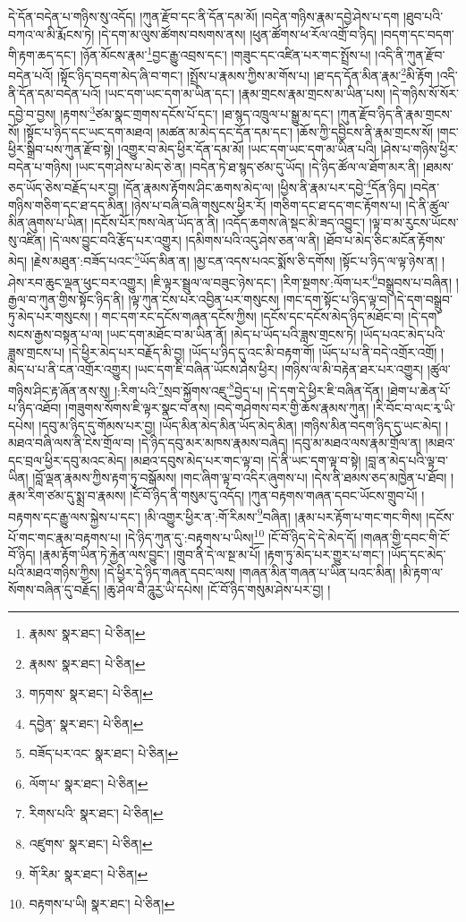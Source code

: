 དེ་དོན་བདེན་པ་གཉིས་སུ་འདོད། །ཀུན་རྫོབ་དང་ནི་དོན་དམ་མོ། །བདེན་གཉིས་རྣམ་དབྱེ་ཤེས་པ་དག །ཐུབ་པའི་བཀའ་ལ་མི་རྨོངས་ཏེ། །དེ་དག་མ་ལུས་ཚོགས་བསགས་ནས། །ཕུན་ཚོགས་ཕ་རོལ་འགྲོ་བ་ཉིད། །བདག་དང་བདག་གི་རྟག་ཆད་དང་། །ཉོན་མོངས་རྣམ་\footnote{རྣམས་  སྣར་ཐང་།  པེ་ཅིན། }བྱང་རྒྱུ་འབྲས་དང་། །གཟུང་དང་འཛིན་པར་གང་སྤྲོས་པ། །འདི་ནི་ཀུན་རྫོབ་བདེན་པའོ། །སྟོང་ཉིད་བདག་མེད་ཞི་བ་གང་། །སྤྲོས་པ་རྣམས་ཀྱིས་མ་གོས་པ། །ཐ་དད་དོན་མིན་རྣམ་\footnote{རྣམས་  སྣར་ཐང་།  པེ་ཅིན། }མི་རྟོག །འདི་ནི་དོན་དམ་བདེན་པའོ། །ཡང་དག་ཡང་དག་མ་ཡིན་དང་། །རྣམ་གྲངས་རྣམ་གྲངས་མ་ཡིན་པས། །དེ་གཉིས་སོ་སོར་དབྱེ་བ་བྱས། །རྟགས་\footnote{གཏགས་  སྣར་ཐང་།  པེ་ཅིན། }ཙམ་སྣང་གྲགས་དངོས་པོ་དང་། །ཐ་སྙད་འཁྲུལ་པ་སྒྱུ་མ་དང་། །ཀུན་རྫོབ་ཉིད་ནི་རྣམ་གྲངས་སོ། །སྟོང་པ་ཉིད་དང་ཡང་དག་མཐའ། །མཚན་མ་མེད་དང་དོན་དམ་དང་། །ཆོས་ཀྱི་དབྱིངས་ནི་རྣམ་གྲངས་སོ། །གང་ཕྱིར་སྒྲིབ་པས་ཀུན་རྫོབ་སྟེ། །འགྱུར་བ་མེད་ཕྱིར་དོན་དམ་མོ། །ཡང་དག་ཡང་དག་མ་ཡིན་པའི། །ཤེས་པ་གཉིས་ཕྱིར་བདེན་པ་གཉིས། །ཡང་དག་ཤེས་པ་མེད་ཅེ་ན། །བདེན་ཏེ་ཐ་སྙད་ཙམ་དུ་ཡོད། །དེ་ཉིད་ཚོལ་ལ་ཐོག་མར་ནི། །ཐམས་ཅད་ཡོད་ཅེས་བརྗོད་པར་བྱ། །དོན་རྣམས་རྟོགས་ཤིང་ཆགས་མེད་ལ། །ཕྱིས་ནི་རྣམ་པར་དབྱེ་\footnote{དབྱེན་  སྣར་ཐང་།  པེ་ཅིན། }དོན་ཉིད། །བདེན་གཉིས་གཅིག་དང་ཐ་དད་མིན། །ཉེས་པ་བཞི་བཞི་གསུངས་ཕྱིར་རོ། །གཅིག་དང་ཐ་དད་གང་རྟོགས་པ། །དེ་ནི་ཚུལ་མིན་ཞུགས་པ་ཡིན། །དངོས་པོར་ཁས་ལེན་ཡོད་ན་ནི། །འདོད་ཆགས་ཞེ་སྡང་མི་ཟད་འབྱུང་། །ལྟ་བ་མ་རུངས་ཡོངས་སུ་འཛིན། །དེ་ལས་བྱུང་བའི་རྩོད་པར་འགྱུར། །དམིགས་པའི་འདུ་ཤེས་ཅན་ལ་ནི། །ཐོབ་པ་མེད་ཅིང་མངོན་རྟོགས་མེད། །རྗེས་མཐུན་:བཟོད་པའང་\footnote{བཟོད་པར་འང་  སྣར་ཐང་།  པེ་ཅིན། }ཡོད་མིན་ན། །མྱ་ངན་འདས་པའང་སྨོས་ཅི་དགོས། །སྟོང་པ་ཉིད་ལ་ལྟ་ཉེས་ན། །ཤེས་རབ་ཆུང་ལྡན་ཕུང་བར་འགྱུར། །ཇི་ལྟར་སྦྲུལ་ལ་བཟུང་ཉེས་དང་། །རིག་སྔགས་:ལོག་པར་\footnote{ལོག་པ་  སྣར་ཐང་།  པེ་ཅིན། }བསྒྲུབས་པ་བཞིན། །རྒྱལ་བ་ཀུན་གྱིས་སྟོང་ཉིད་ནི། །ལྟ་ཀུན་ངེས་པར་འབྱིན་པར་གསུངས། །གང་དག་སྟོང་པ་ཉིད་ལྟ་བ། །དེ་དག་བསྒྲུབ་ཏུ་མེད་པར་གསུངས། །
གང་དག་རང་དངོས་གཞན་དངོས་ཀྱིས། །དངོས་དང་དངོས་མེད་ཉིད་མཐོང་བ། །དེ་དག་སངས་རྒྱས་བསྟན་པ་ལ། །ཡང་དག་མཐོང་བ་མ་ཡིན་ནོ། །མེད་པ་ཡོད་པའི་ཟླས་གྲངས་ཏེ། །ཡོད་པའང་མེད་པའི་ཟླས་གྲངས་པ། །དེ་ཕྱིར་མེད་པར་བརྗོད་མི་བྱ། །ཡོད་པ་ཉིད་དུ་འང་མི་བརྟག་གོ། །ཡོད་པ་པ་ནི་བདེ་འགྲོར་འགྲོ། །མེད་པ་པ་ནི་ངན་འགྲོར་འགྱུར། །ཡང་དག་ཇི་བཞིན་ཡོངས་ཤེས་ཕྱིར། །གཉིས་ལ་མི་བརྟེན་ཐར་པར་འགྱུར། །ཚུལ་གཉིས་ཤིང་རྟ་ཞོན་ནས་སུ། །:རིག་པའི་\footnote{རིགས་པའི་  སྣར་ཐང་།  པེ་ཅིན། }སྲབ་སྐྱོགས་འཇུ་\footnote{འཛུགས་  སྣར་ཐང་།  པེ་ཅིན། }བྱེད་པ། །དེ་དག་དེ་ཕྱིར་ཇི་བཞིན་དོན། །ཐེག་པ་ཆེན་པོ་པ་ཉིད་འཐོབ། །གཟུགས་སོགས་ཇི་ལྟར་སྣང་བ་ནས། །བདེ་གཤེགས་བར་གྱི་ཆོས་རྣམས་ཀུན། །རི་བོང་བ་ལང་རྭ་ཡི་དཔེས། །དབུ་མ་ཉིད་དུ་གོམས་པར་བྱ། །ཡོད་མིན་མེད་མིན་ཡོད་མེད་མིན། །གཉིས་མིན་བདག་ཉིད་དུ་ཡང་མེད། །མཐའ་བཞི་ལས་ནི་ངེས་གྲོལ་བ། །དེ་ཉིད་དབུ་མར་མཁས་རྣམས་བཞེད། །དབུ་མ་མཐའ་ལས་རྣམ་གྲོལ་ན། །མཐའ་དང་བྲལ་ཕྱིར་དབུ་མའང་མེད། །མཐའ་དབུས་མེད་པར་གང་ལྟ་བ། །དེ་ནི་ཡང་དག་ལྟ་བ་སྟེ། །བླ་ན་མེད་པའི་ལྟ་བ་ཡིན། །བློ་ལྡན་རྣམས་ཀྱིས་རྟག་ཏུ་བསྒོམས། །གང་ཞིག་ལྟ་བ་འདིར་ཞུགས་པ། །དེས་ནི་ཐམས་ཅད་མཁྱེན་པ་ཐོབ། །རྣམ་རིག་ཙམ་དུ་སྨྲ་བ་རྣམས། །ངོ་བོ་ཉིད་ནི་གསུམ་དུ་འདོད། །ཀུན་བརྟགས་གཞན་དབང་ཡོངས་གྲུབ་པོ། །བརྟགས་དང་རྒྱུ་ལས་སྐྱེས་པ་དང་། །མི་འགྱུར་ཕྱིར་ན་:གོ་རིམས་\footnote{གོ་རིམ་  སྣར་ཐང་།  པེ་ཅིན། }བཞིན། །རྣམ་པར་རྟོག་པ་གང་གང་གིས། །དངོས་པོ་གང་གང་རྣམ་བརྟགས་པ། །དེ་ཉིད་ཀུན་དུ་:བརྟགས་པ་ཡིས།\footnote{བརྟགས་པ་ཡི།  སྣར་ཐང་།  པེ་ཅིན། } །ངོ་བོ་ཉིད་དེ་དེ་མེད་དོ། །གཞན་གྱི་དབང་གི་ངོ་བོ་ཉིད། །རྣམ་རྟོག་ཡིན་ཏེ་རྐྱེན་ལས་བྱུང་། །གྲུབ་ནི་དེ་ལ་སྔ་མ་པོ། །རྟག་ཏུ་མེད་པར་གྱུར་པ་གང་། །ཡོད་དང་མེད་པའི་མཐའ་གཉིས་ཀྱིས། །དེ་ཕྱིར་དེ་ཉིད་གཞན་དབང་ལས། །གཞན་མིན་གཞན་པ་ཡིན་པའང་མིན། །མི་རྟག་ལ་སོགས་བཞིན་དུ་བརྗོད། །ཆུ་ཤེལ་བཻ་ཌཱུརྱ་ཡི་དཔེས། །ངོ་བོ་ཉིད་གསུམ་ཤེས་པར་བྱ། །
